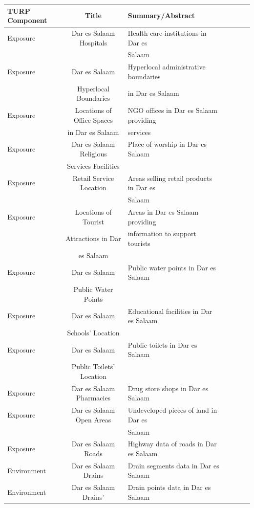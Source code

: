 \documentclass[a4paper,12pt,twoside]{article}
\begin{document}
\begin{tabular}{|l|c|l|c|l|c|l|}
\hline
\bfseries TURP Component & \bfseries Title & \bfseries Summary/Abstract\\
\hline
Exposure & Dar es Salaam Hospitals & 
Health care institutions in Dar es\\
{} & {} & Salaam\\
\hline
Exposure & Dar es Salaam & Hyperlocal administrative boundaries \\
{} & Hyperlocal Boundaries & in Dar es Salaam\\
\hline
Exposure & Locations of Office Spaces & NGO offices in Dar es Salaam providing\\
{} & in Dar es Salaam & services\\
\hline
Exposure & Dar es Salaam Religious  & Place of worship in Dar es Salaam\\
{} & Services Facilities & {}\\
\hline
Exposure & Retail Service Location & Areas selling retail products in Dar es \\
{} & {} & Salaam\\
\hline
Exposure & Locations of Tourist & Areas in Dar es Salaam providing\\
 {} & Attractions in Dar & information to support tourists\\
 {} & es Salaam & {}\\
\hline
Exposure & Dar es Salaam & Public water points in Dar es Salaam\\
{} & Public Water Points & {}\\
\hline 
Exposure & Dar es Salaam & Educational facilities in Dar es Salaam\\
{} & Schools’ Location & {}\\
\hline
Exposure & Dar es Salaam & Public toilets in Dar es Salaam\\
{} & Public Toilets' Location & {}\\
\hline
Exposure & Dar es Salaam Pharmacies & Drug store shops in Dar es Salaam\\
\hline
Exposure & Dar es Salaam Open Areas & Undeveloped pieces of land in Dar es \\
{} & {} & Salaam\\
\hline
Exposure & Dar es Salaam Roads & Highway data of roads in Dar es Salaam\\
\hline
Environment & Dar es Salaam Drains & Drain segments data in Dar es Salaam\\
\hline
Environment & Dar es Salaam Drains' & Drain points data in Dar es Salaam\\

\end{tabular}
\end{document}
